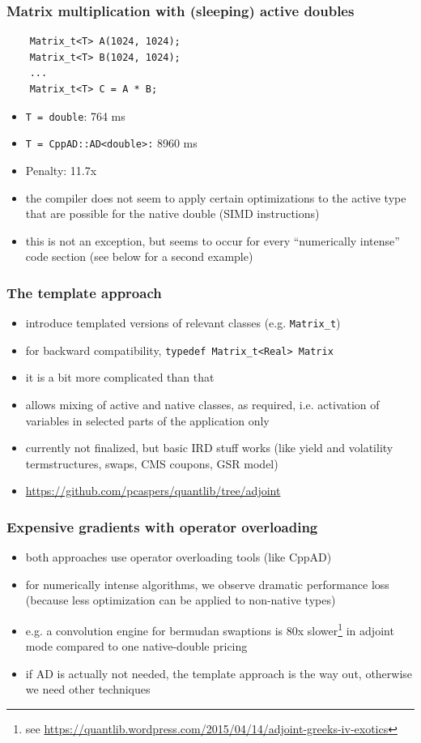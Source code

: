 \documentclass{beamer}
\begin{document}
\begin{frame}[fragile]
\frametitle{Matrix multiplication with (sleeping) active doubles}
\begin{verbatim}
    Matrix_t<T> A(1024, 1024);
    Matrix_t<T> B(1024, 1024);
    ...
    Matrix_t<T> C = A * B;
\end{verbatim}
\begin{itemize}
\item \verb+T = double+: 764 ms
\item \verb+T = CppAD::AD<double>:+ 8960 ms
\item Penalty: 11.7x
\item the compiler does not seem to apply certain optimizations to the active type that are possible for the native double (SIMD instructions)
\item this is not an exception, but seems to occur for every ``numerically intense'' code section (see below for a second example)
\end{itemize}
\end{frame}

\begin{frame}[fragile]
\frametitle{The template approach}
\begin{itemize}
\item introduce templated versions of relevant classes (e.g. \verb+Matrix_t+)
\item for backward compatibility, \verb+typedef Matrix_t<Real> Matrix+
\item it is a bit more complicated than that
\item allows mixing of active and native classes, as required, i.e. activation of variables in selected parts of the application only
\item currently not finalized, but basic IRD stuff works (like yield and volatility termstructures, swaps, CMS coupons, GSR model)
\item \url{https://github.com/pcaspers/quantlib/tree/adjoint}
\end{itemize}
\end{frame}

\begin{frame}[fragile]
\frametitle{Expensive gradients with operator overloading}
\begin{itemize}
\item both approaches use operator overloading tools (like CppAD)
\item for numerically intense algorithms, we observe dramatic performance loss (because less optimization can be applied to non-native types)
\item e.g. a convolution engine for bermudan swaptions is 80x slower\footnote{see \tiny\url{https://quantlib.wordpress.com/2015/04/14/adjoint-greeks-iv-exotics}}
in adjoint mode compared to one native-double pricing
\item if AD is actually not needed, the template approach is the way out, otherwise we need other techniques
\end{itemize}
\end{frame}
\end{document}
